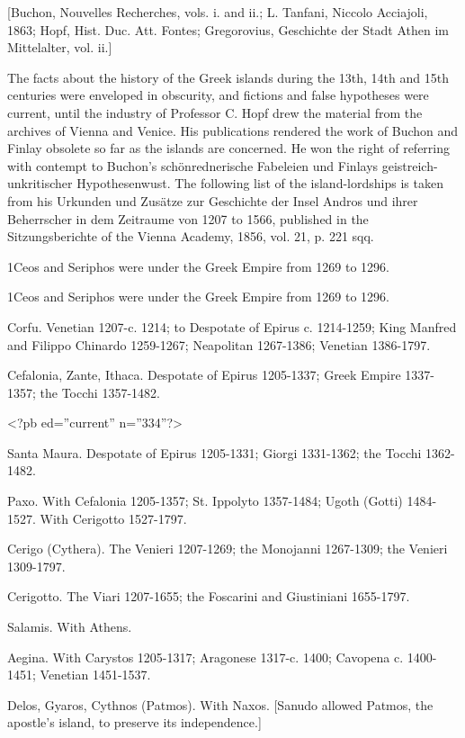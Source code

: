 [Buchon, Nouvelles Recherches, vols. i. and ii.; L. Tanfani, Niccolo Acciajoli, 1863; Hopf, Hist. Duc. Att. Fontes; Gregorovius, Geschichte der Stadt Athen im Mittelalter, vol. ii.]


The facts about the history of the Greek islands during the 13th, 14th and 15th centuries were enveloped in obscurity, and fictions and false hypotheses were current, until the industry of Professor C. Hopf drew the material from the archives of Vienna and Venice. His publications rendered the work of Buchon and Finlay obsolete so far as the islands are concerned. He won the right of referring with contempt to Buchon\texthebrew{}’s schönrednerische Fabeleien und Finlays geistreich-unkritischer Hypothesenwust. The following list of the island-lordships is taken from his Urkunden und Zusätze zur Geschichte der Insel Andros und ihrer Beherrscher in dem Zeitraume von 1207 to 1566, published in the Sitzungsberichte of the Vienna Academy, 1856, vol. 21, p. 221 sqq.

1Ceos and Seriphos were under the Greek Empire from 1269 to 1296.

1Ceos and Seriphos were under the Greek Empire from 1269 to 1296.

Corfu.
Venetian 1207-c. 1214; to Despotate of Epirus c. 1214-1259; King Manfred and Filippo Chinardo 1259-1267; Neapolitan 1267-1386; Venetian 1386-1797.

Cefalonia, Zante, Ithaca.
Despotate of Epirus 1205-1337; Greek Empire 1337-1357; the Tocchi 1357-1482.

<?pb ed=''current'' n=''334''?>

Santa Maura.
Despotate of Epirus 1205-1331; Giorgi 1331-1362; the Tocchi 1362-1482.

Paxo.
With Cefalonia 1205-1357; St. Ippolyto 1357-1484; Ugoth (Gotti) 1484-1527. With Cerigotto 1527-1797.

Cerigo (Cythera).
The Venieri 1207-1269; the Monojanni 1267-1309; the Venieri 1309-1797.

Cerigotto.
The Viari 1207-1655; the Foscarini and Giustiniani 1655-1797.

Salamis.
With Athens.

Aegina.
With Carystos 1205-1317; Aragonese 1317-c. 1400; Cavopena c. 1400-1451; Venetian 1451-1537.

Delos, Gyaros, Cythnos (Patmos).
With Naxos. [Sanudo allowed Patmos, the apostle\texthebrew{}’s island, to preserve its independence.]

